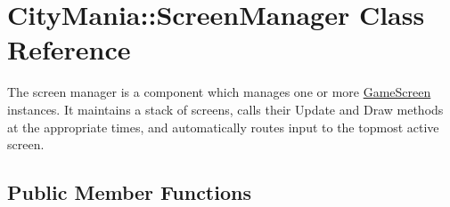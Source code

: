 \hypertarget{classCityMania_1_1ScreenManager}{
\section{CityMania::ScreenManager Class Reference}
\label{classCityMania_1_1ScreenManager}
}


The screen manager is a component which manages one or more \hyperlink{classCityMania_1_1GameScreen}{GameScreen} instances. It maintains a stack of screens, calls their Update and Draw methods at the appropriate times, and automatically routes input to the topmost active screen.  
\subsection*{Public Member Functions}

